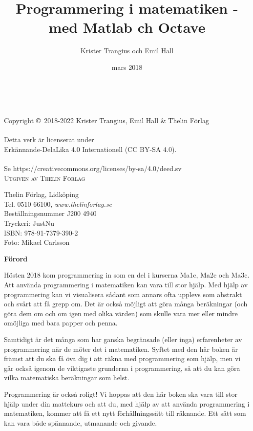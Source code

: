 \documentclass[14pt]{extbook}
\title{Programmering i matematiken - med Matlab ch Octave}
\author{Krister Trangius och Emil Hall}
\date{mars 2018}
\begin{document}
\newpage
~\vfill
\thispagestyle{empty}

\noindent Copyright \copyright\ 2018-2022 Krister Trangius,  Emil Hall \& Thelin Förlag\\ %
\\
Detta verk är licenserat under\\
Erkännande-DelaLika 4.0 Internationell (CC BY-SA 4.0).\\
\\
Se https://creativecommons.org/licenses/by-sa/4.0/deed.sv\\

\noindent \textsc{Utgiven av Thelin Förlag} %

Thelin Förlag, Lidköping\\
Tel. 0510-66100, \emph{www.thelinforlag.se}\\
Beställningsnummer J200 4940\\
Tryckeri: JustNu\\
ISBN: 978-91-7379-390-2\\
Foto: Mikael Carlsson

\newpage

\newpage
\thispagestyle{empty}
{\Large{\textbf{Förord}}}

Hösten 2018 kom programmering in som en del i kurserna Ma1c, Ma2c och Ma3c. Att använda programmering i matematiken kan vara till stor hjälp. Med hjälp av programmering kan vi visualisera sådant som annars ofta upplevs som abstrakt och svårt att få grepp om. Det är också möjligt att göra många beräkningar (och göra dem om och om igen med olika värden) som skulle vara mer eller mindre omöjliga med bara papper och penna.

Samtidigt är det många som har ganska begränsade (eller inga) erfarenheter av programmering när de möter det i matematiken. Syftet med den här boken är främst att du ska få öva dig i att räkna med programmering som hjälp, men vi går också igenom de viktigaste grunderna i programmering, så att du kan göra  vilka matematiska beräkningar som helst.

Programmering är också roligt! Vi hoppas att den här boken ska vara till stor hjälp under din mattekurs och att du, med hjälp av att använda programmering i matematiken, kommer att få ett nytt förhållningssätt till räknande. Ett sätt som kan vara både spännande, utmanande och givande. 
\end{document}
